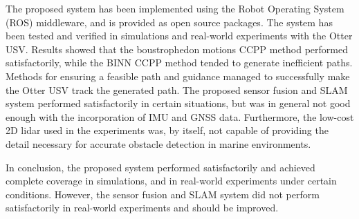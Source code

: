 The proposed system has been implemented using the Robot Operating System (ROS) middleware, and is provided as open source packages. The system has been tested and verified in simulations and real-world experiments with the Otter USV. Results showed that the boustrophedon motions CCPP method performed satisfactorily, while the BINN CCPP method tended to generate inefficient paths. Methods for ensuring a feasible path and guidance managed to successfully make the Otter USV track the generated path. The proposed sensor fusion and SLAM system performed satisfactorily in certain situations, but was in general not good enough with the incorporation of IMU and GNSS data. Furthermore, the low-cost 2D lidar used in the experiments was, by itself, not capable of providing the detail necessary for accurate obstacle detection in marine environments. 

In conclusion, the proposed system performed satisfactorily and achieved complete coverage in simulations, and in real-world experiments under certain conditions. However, the sensor fusion and SLAM system did not perform satisfactorily in real-world experiments and should be improved. 

\clearpage




